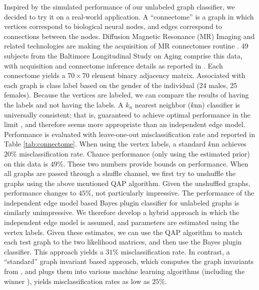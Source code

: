 \documentclass[10pt,journal,cspaper,compsoc]{IEEEtran}
\begin{document}
Inspired by the simulated performance of our unlabeled graph classifier, we decided to try it on a real-world application.  A ``connectome'' is a graph in which vertices correspond to biological neural nodes, and edges correspond to connections between the nodes.  Diffusion Magnetic Resonance (MR) Imaging and related technologies are making the acquisition of MR connectomes routine \cite{Hagmann2010}.  49 subjects from the Baltimore Longitudinal Study on Aging comprise this data, with acquisition and connectome inference details as reported in \cite{Gray11}.  Each connectome yields a $70 \times 70$ element binary adjacency matrix.  Associated with each graph is class label based on the gender of the individual (24 males, 25 females).  Because the vertices are labeled, we can compare the results of having the labels and not having the labels.  A $k_n$ nearest neighbor ($k$nn) classifier is universally consistent; that is, guaranteed to achieve optimal performance in the limit \cite{Stone1977}, and therefore seems more appropriate than an independent edge model.  Performance is evaluated with leave-one-out misclassification rate and reported in Table \ref{tab:connectome}. When using the vertex labels, a standard $k$nn achieves $20\%$ misclassification rate.  Chance performance (only using the estimated prior) on this data is $49\%$.  These two numbers provide bounds on performance.  When all graphs are passed through a shuffle channel, we first try to unshuffle the graphs using the above mentioned QAP algorithm.  Given the unshuffled graphs, performance changes to $45\%$, not particularly impressive.  The performance of the independent edge model based Bayes plugin classifier for unlabeled graphs is similarly unimpressive.  We therefore develop a hybrid approach in which the independent edge model is assumed, and parameters are estimated using the vertex labels.  Given these estimates, we can use the QAP algorithm to match each test graph to the two likelihood matrices, and then use the Bayes plugin classifier.  This approach yields a $31\%$ misclassification rate. In contrast, a ``standard'' graph invariant based approach, which computes the graph invariants from \cite{PCP10}, and plugs them into various machine learning algorithms (including the winner \cite{Crammer2008}), yields misclassification rates as low as $25\%$. 
\end{document}
